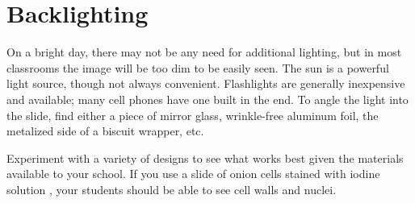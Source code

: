 \section{Backlighting}
On a bright day, there may not be any need for additional lighting, but in most classrooms the image will be too dim to be easily seen. The sun is a powerful light source, though not always convenient. Flashlights are generally inexpensive and available; many cell phones have one built in the end. To angle the light into the slide, find either a piece of mirror glass, wrinkle-free aluminum foil, the metalized side of a biscuit wrapper, etc.

Experiment with a variety of designs to see what works best given the materials available to your school. If you use a slide of onion cells stained with iodine solution
, your students should be able to see cell walls and nuclei.

